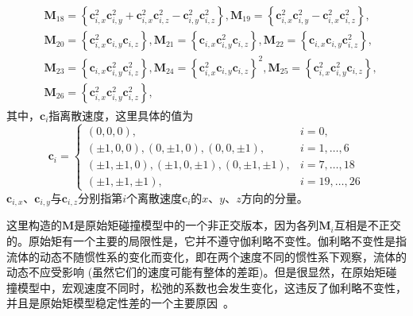 \begin{align}
\begin{split}
    & \boldsymbol{M}_{18}=\left\{\boldsymbol{c}_{i, x}^2 \boldsymbol{c}_{i, y}^2+\boldsymbol{c}_{i, x}^2 \boldsymbol{c}_{i, z}^2-\boldsymbol{c}_{i, y}^2 \boldsymbol{c}_{i, z}^2\right\}, \boldsymbol{M}_{19}=\left\{\boldsymbol{c}_{i, x}^2 \boldsymbol{c}_{i, y}^2-\boldsymbol{c}_{i, x}^2 \boldsymbol{c}_{i, z}^2\right\}, \\
    & \boldsymbol{M}_{20}=\left\{\boldsymbol{c}_{i, x}^2 \boldsymbol{c}_{i, y} \boldsymbol{c}_{i, z}\right\}, \boldsymbol{M}_{21}=\left\{\boldsymbol{c}_{i, x} \boldsymbol{c}_{i, y}^2 \boldsymbol{c}_{i, z}\right\}, \boldsymbol{M}_{22}=\left\{\boldsymbol{c}_{i, x} \boldsymbol{c}_{i, y} \boldsymbol{c}_{i, z}^2\right\}, \\
    & \boldsymbol{M}_{23}=\left\{\boldsymbol{c}_{i, x} \boldsymbol{c}_{i, y}^2 \boldsymbol{c}_{i, z}^2\right\}, \boldsymbol{M}_{24}=\left\{\boldsymbol{c}_{i, x}^2 \boldsymbol{c}_{i, y} \boldsymbol{c}_{i, z}\right\}^2, \boldsymbol{M}_{25}=\left\{\boldsymbol{c}_{i, x}^2 \boldsymbol{c}_{i, y}^2 \boldsymbol{c}_{i, z}\right\}, \\
    & \boldsymbol{M}_{26}=\left\{\boldsymbol{c}_{i, x}^2 \boldsymbol{c}_{i, y}^2 \boldsymbol{c}_{i, z}^2\right\},
\end{split}
\label{eq:rm_mrt}
\end{align}
其中，$\boldsymbol{c}_{i}$指离散速度，这里具体的值为
\begin{equation}
    \boldsymbol{c}_i= \begin{cases}(0,0,0), & i=0, \\
        ( \pm 1,0,0),(0, \pm 1,0),(0,0, \pm 1), & i=1, \ldots, 6 \\
        ( \pm 1, \pm 1,0),( \pm 1,0, \pm 1),(0, \pm 1, \pm 1), & i=7, \ldots, 18 \\
        ( \pm 1, \pm 1, \pm 1), & i=19, \ldots, 26\end{cases}
\end{equation}
$\boldsymbol{c}_{i, x}$、$\boldsymbol{c}_{i, y}$与$\boldsymbol{c}_{i, z}$分别指第$i$个离散速度$\boldsymbol{c}_{i}$的$x$、$y$、$z$方向的分量。

这里构造的$\mathbf{M}$是原始矩碰撞模型中的一个非正交版本，因为各列$\mathbf{M}_{i}$互相是不正交的。原始矩有一个主要的局限性是，它并不遵守伽利略不变性。伽利略不变性是指流体的动态不随惯性系的变化而变化，即在两个速度不同的惯性系下观察，流体的动态不应受影响 (虽然它们的速度可能有整体的差距)。但是很显然，在原始矩碰撞模型中，宏观速度不同时，松弛的系数也会发生变化，这违反了伽利略不变性，并且是原始矩模型稳定性差的一个主要原因~\cite{PhysRevE.95.013310}。

